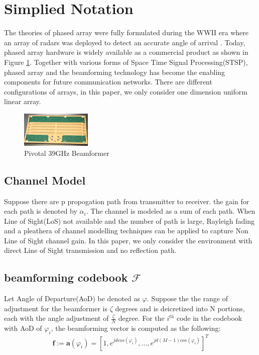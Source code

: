 \documentclass[journal]{IEEEtran}
\begin{document}
\section{Simplied Notation}
The theories of phased array were fully formulated during the WWII era where an array of radars was deployed to detect an accurate angle of arrival \cite{5237174}. Today, phased array hardware is widely available as a commercial product as shown in Figure \ref{fig:pivotal}. Together with various forms of Space Time Signal Processing(STSP), phased array and the beamforming technology has become the enabling components for future communication networks. There are different configurations of arrays, in this paper, we only consider one dimension uniform linear array.

\begin{figure}[H]
\centering
\includegraphics[width=0.3\textwidth]{beamformer.png}
\caption{Pivotal 39GHz Beamformer}
\label{fig:pivotal}
\end{figure}
\subsection{Channel Model}

Suppose there are p propogation path from transmitter to receiver. the gain for each path is denoted by $\alpha_i$. The channel is modeled as a sum of each path. When Line of Sight(LoS) not available and the number of path is large, Rayleigh fading and a pleathera of channel modelling techniques can be applied to capture Non Line of Sight channel gain. In this paper, we only consider the environment with direct Line of Sight transmission and no reflection path.



\subsection{beamforming codebook $\mathcal{F}$}

Let Angle of Departure(AoD) be denoted as $\varphi$. Suppose the the range of adjustment for the beamformer is $\zeta$ degrees and is deicretized into N portions, each with the angle adjustment of $\frac{\zeta}{N}$ degree. For the $i^{th}$ code in the codebook with AoD of $\varphi_i$, the beamforming vector is computed as the following:
\begin{equation}
\textbf{f} := \textbf{a}(\varphi_i)= [1,e^{jdcos(\varphi_i)},...,e^{jd(M-1)cos(\varphi_i)}]^T
\end{equation}
\end{document}
